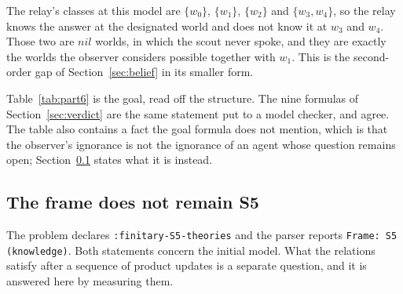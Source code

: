 \documentclass[11pt,a4paper]{article}
\theoremstyle{definition}
\newcommand{\code}[1]{\texttt{\small #1}}
\begin{document}
The relay's classes at this model are $\{w_0\}$, $\{w_1\}$, $\{w_2\}$ and
$\{w_3, w_4\}$, so the relay knows the answer at the designated world and does
not know it at $w_3$ and $w_4$. Those two are $\mathit{nil}$ worlds, in which
the scout never spoke, and they are exactly the worlds the observer considers
possible together with $w_1$. This is the second-order gap of
Section~\ref{sec:belief} in its smaller form.

\begin{table}[H]
\centering\small
\caption{The final model, after \code{relay-clean\_relay\_scout\_a06}. The
class of the designated world $w_2$ is a singleton for the scout and for the
relay, so both know which site is contaminated. The observer's image at $w_2$
is $\{w_1, w_5, w_7\}$, which contains one world for each of the three sites
and does not contain $w_2$: the observer does not know, and does not consider
the actual world possible.}
\label{tab:part6}

\end{table}

Table~\ref{tab:part6} is the goal, read off the structure. The nine formulas of
Section~\ref{sec:verdict} are the same statement put to a model checker, and
agree. The table also contains a fact the goal formula does not mention, which
is that the observer's ignorance is not the ignorance of an agent whose
question remains open; Section~\ref{sec:frame} states what it is instead.

\subsection{The frame does not remain S5}
\label{sec:frame}

The problem declares \code{:finitary-S5-theories} and the parser reports
\code{Frame: S5 (knowledge)}. Both statements concern the initial model. What
the relations satisfy after a sequence of product updates is a separate
question, and it is answered here by measuring them.

\begin{table}[H]
\centering\small
\caption{The properties of each agent's accessibility relation at each recorded
model, computed from the relation. The frame column names the strongest of the
two standard frames the relation satisfies: $\mathrm{S5}$ requires reflexivity,
symmetry and transitivity; $\mathrm{KD45}$ requires seriality, transitivity and
the Euclidean property, and does not require reflexivity.}
\label{tab:frames}

\end{table}
\end{document}
